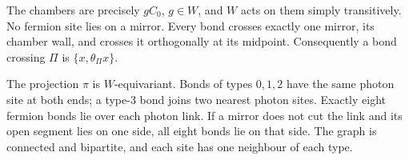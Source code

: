 \begin{proposition}\label{prop:reg-geometry}
The chambers are precisely $gC_0$, $g\in W$, and $W$ acts on them
simply transitively. No fermion site lies on a mirror. Every bond
crosses exactly one mirror, its chamber wall, and crosses it
orthogonally at its midpoint. Consequently a bond crossing $\Pi$ is
$\{x,\theta_\Pi x\}$.

The projection $\pi$ is $W$-equivariant. Bonds of types $0,1,2$ have
the same photon site at both ends; a type-$3$ bond joins two nearest
photon sites. Exactly eight fermion bonds lie over each photon link.
If a mirror does not cut the link and its open segment lies on one
side, all eight bonds lie on that side.
The graph is connected and bipartite, and each site has one neighbour
of each type.
\end{proposition}

